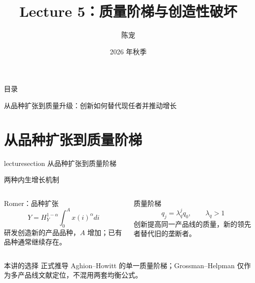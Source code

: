 \documentclass[aspectratio=32]{beamer}
\title[Lecture 5: Quality Ladder]{Lecture 5：质量阶梯与创造性破坏}
\author{陈宠\inst{1}}
\institute{中国人民大学经济学院\inst{1}}
\date{2026 年秋季}
\newcommand{\lecturesectionpage}[1]{%
\begin{frame}[plain]
\begin{center}
\vfill
\begin{beamercolorbox}[wd=0.74\textwidth,rounded=true,shadow=true,center,sep=1em]{lecturesection}
\LARGE #1
\end{beamercolorbox}
\vfill
\end{center}
\end{frame}
}
\begin{document}
\begin{frame}
\maketitle
\end{frame}

\begin{frame}{目录}
\tableofcontents[hideallsubsections]
\vspace{0.25cm}
\begin{center}
\textcolor{LectureBlue}{从品种扩张到质量升级：创新如何替代现任者并推动增长}
\end{center}
\end{frame}

\section{从品种扩张到质量阶梯}
\lecturesectionpage{从品种扩张到质量阶梯}

\begin{frame}{两种内生增长机制}
\small
\begin{columns}[T]
\begin{block}{Romer：品种扩张}
\[
  Y=H_Y^{1-\alpha}\int_0^A x(i)^\alpha di
\]
研发创造新的产品品种，$A$ 增加；已有品种通常继续存在。
\end{block}
\begin{block}{质量阶梯}
\[
  q_j=\lambda_q^j q_0,\qquad \lambda_q>1
\]
创新提高同一产品线的质量，新的领先者替代旧的垄断者。
\end{block}
\end{columns}
\vspace{0.18cm}
\begin{alertblock}{本讲的选择}
正式推导 Aghion--Howitt 的单一质量阶梯；Grossman--Helpman 仅作为多产品线文献定位，不混用两套均衡公式。
\end{alertblock}
\end{frame}
\end{document}
